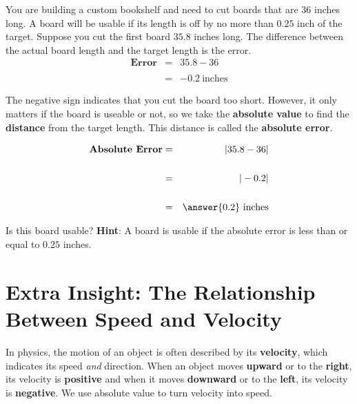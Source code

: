 \documentclass{ximera}[font=12pt]
\begin{document}
\begin{problem}
You are building a custom bookshelf and need to cut boards that are $36$ inches long.  A board will be usable if its 
length is off by no more than $0.25$ inch of the target.  Suppose you cut the first board $35.8$ inches long.  The 
difference between the actual board length and the target length is the error.
\begin{eqnarray*}
  \textbf{Error} &=& 35.8 - 36 \\
        & & \\
        &=& -0.2 \  \textrm{inches}
\end{eqnarray*}

The negative sign indicates that you cut the board too short.  However, it only matters if the board is useable or not, so we 
take the \textbf{absolute value} to find the \textbf{distance} from the target length.  This distance is called the \textbf{absolute error}.

\begin{eqnarray*}
\textbf{Absolute Error} &=& |35.8 - 36| \\
    & & \\
    &=& |-0.2| \\
    & & \\
    &=&  \answer{0.2} \ \textrm{inches}
\end{eqnarray*}

Is this board usable? \textbf{Hint}: A board is usable if the absolute error is less than or equal to $0.25$ inches.

\begin{multipleChoice}
\end{multipleChoice}

\end{problem}

\section*{Extra Insight:  The Relationship Between Speed and Velocity}

In physics, the motion of an object is often described by its \textbf{velocity}, which indicates its speed \emph{and} direction.  
When an object moves \textbf{upward} or to the \textbf{right}, its velocity is \textbf{positive} and when it moves 
\textbf{downward} or to the \textbf{left}, its velocity is \textbf{negative}.  We use
absolute value to turn velocity into speed.
\end{document}
